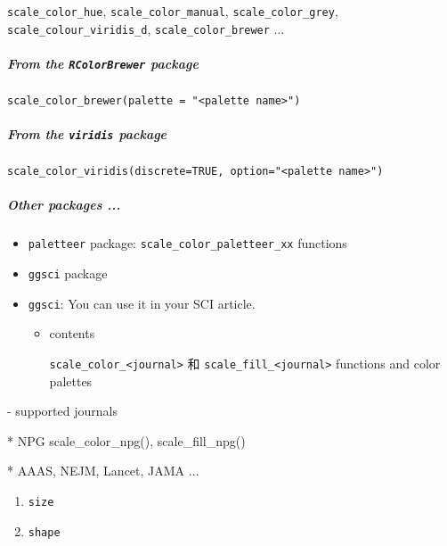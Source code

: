 \documentclass[
]{article}
\newenvironment{Shaded}{}{}
\newcommand{\NormalTok}[1]{#1}
\begin{document}
\texttt{scale\_color\_hue}, \texttt{scale\_color\_manual},
\texttt{scale\_color\_grey}, \texttt{scale\_colour\_viridis\_d},
\texttt{scale\_color\_brewer} ...

\hypertarget{from-the-rcolorbrewer-package}{%
\subparagraph{\texorpdfstring{From the \texttt{RColorBrewer}
package}{From the RColorBrewer package}}\label{from-the-rcolorbrewer-package}}

\texttt{scale\_color\_brewer(palette\ =\ "\textless{}palette\ name\textgreater{}")}

\hypertarget{from-the-viridis-package}{%
\subparagraph{\texorpdfstring{From the \texttt{viridis}
package}{From the viridis package}}\label{from-the-viridis-package}}

\texttt{scale\_color\_viridis(discrete=TRUE,\ option="\textless{}palette\ name\textgreater{}")}

\hypertarget{other-packages-}{%
\subparagraph{Other packages ...}\label{other-packages-}}

\begin{itemize}
\item
  \texttt{paletteer} package: \texttt{scale\_color\_paletteer\_xx}
  functions
\item
  \texttt{ggsci} package
\item
  \texttt{ggsci}: You can use it in your SCI article.

  \begin{itemize}
  \item
    contents

    \texttt{scale\_color\_\textless{}journal\textgreater{}} 和
    \texttt{scale\_fill\_\textless{}journal\textgreater{}} functions and
    color palettes
  \end{itemize}
\end{itemize}

\begin{Shaded}
\begin{Highlighting}[]
\NormalTok{{-} supported journals}

\NormalTok{	* NPG \textasciigrave{}scale\_color\_npg()\textasciigrave{}, \textasciigrave{}scale\_fill\_npg()\textasciigrave{}}

\NormalTok{	* AAAS, NEJM, Lancet, JAMA ... }
\end{Highlighting}
\end{Shaded}

\begin{enumerate}
\def\labelenumi{\arabic{enumi}.}
\item
  \texttt{size}
\item
  \texttt{shape}
\end{enumerate}
\end{document}
